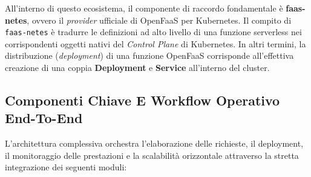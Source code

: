 \documentclass[11pt, a4paper]{article}
\begin{document}
All'interno di questo ecosistema, il componente di raccordo fondamentale è \textbf{faas-netes}, ovvero il \emph{provider} ufficiale di OpenFaaS per Kubernetes. Il compito di \texttt{faas-netes} è tradurre le definizioni ad alto livello di una funzione serverless nei corrispondenti oggetti nativi del \emph{Control Plane} di Kubernetes. In altri termini, la distribuzione (\emph{deployment}) di una funzione OpenFaaS corrisponde all'effettiva creazione di una coppia \textbf{Deployment} e \textbf{Service} all'interno del cluster.


\subsection{Componenti Chiave E Workflow Operativo End-To-End}

L'architettura complessiva orchestra l'elaborazione delle richieste, il deployment, il monitoraggio delle prestazioni e la scalabilità orizzontale attraverso la stretta integrazione dei seguenti moduli:
\end{document}
